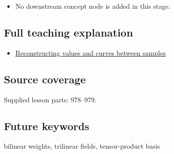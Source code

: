 \begin{itemize}
\tightlist
\item
  No downstream concept node is added in this stage.
\end{itemize}

\subsection{Full teaching explanation}\label{full-teaching-explanation}

\begin{itemize}
\tightlist
\item
  \href{Continuous\%20Notes/Computing\%20Foundations\%20-\%20From\%20Bits\%20to\%20C++\%20and\%20Systems\%20APIs\#Reconstructing\%20values\%20and\%20curves\%20between\%20samples}{Reconstructing values and curves between samples}
\end{itemize}

\subsection{Source coverage}\label{source-coverage}

Supplied lesson parts: 978--979.

\subsection{Future keywords}\label{future-keywords}

bilinear weights, trilinear fields, tensor-product basis
